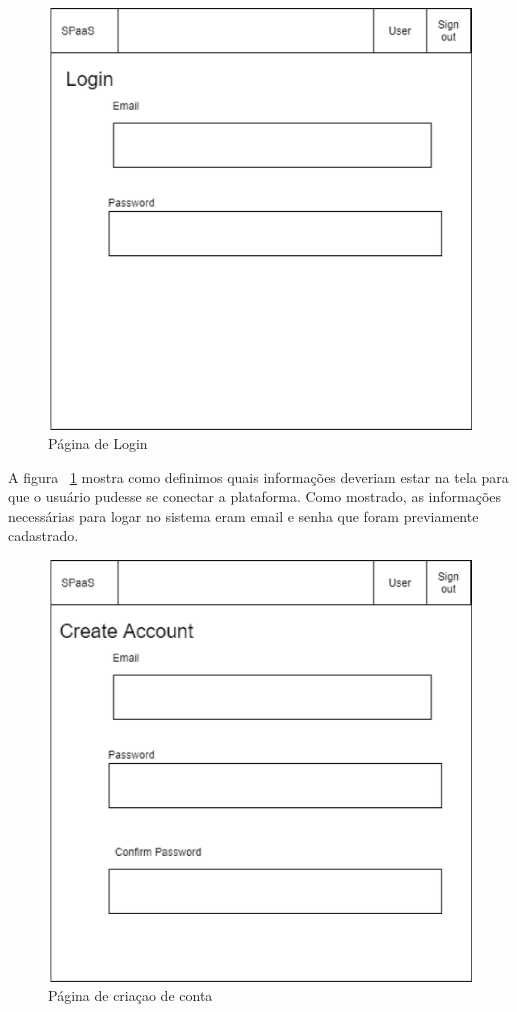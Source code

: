 \documentclass[11pt,twoside]{article}
\begin{document}
\begin{figure}[h!]
  \centering
  \includegraphics[scale=0.4]{login.eps}
  \caption{Página de Login}
  \label{fig:loginScreen}
\end{figure}

A figura ~\ref{fig:loginScreen} mostra como definimos quais informações deveriam estar na tela para que o usuário pudesse se conectar a plataforma. Como mostrado, 
as informações necessárias para logar no sistema eram email e senha que foram previamente cadastrado.

\begin{figure}[h!]
  \centering
  \includegraphics[scale=0.4]{account_reg.eps}
  \caption{Página de criaçao de conta}
  \label{fig:createScreen}
\end{figure}
\end{document}
